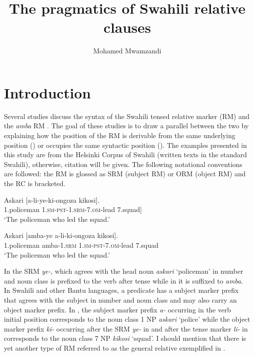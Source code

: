 \documentclass[output=paper,colorlinks,citecolor=brown]{langscibook}
\author{Mohamed Mwamzandi\affiliation{University of North Carolina at Chapel Hill}}
\title{The pragmatics of Swahili relative clauses}
\begin{document}
\maketitle 

\section{Introduction}\label{sec:mwamzandi:1}

Several studies discuss the syntax of the Swahili tensed relative marker (RM)  and the \textit{amba} RM . The goal of these studies is to draw a parallel between the two by explaining how the position of the RM is derivable from the same underlying position (\citealt{Vitale1981, Keach1985}) or occupies the same syntactic position (\citealt{DemuthHarford1999, Ngonyani2001, Ngonyani2006}). The examples presented in this study are from the Helsinki Corpus of Swahili (written texts in the standard Swahili), otherwise, citation will be given. The following notational conventions are followed: the RM is glossed as SRM (subject RM) or ORM (object RM) and the RC is bracketed.

\ea%
    \label{ex:mwamzandi:1}
    \gll    Askari [a-li-ye-ki-ongoza kikosi].\\
            1.policeman  \textsc{1.sm-pst-1.srm-7.om-}lead  7.squad]\\
    \glt    ‘The policeman who led the squad.’
\z

\ea%
    \label{ex:mwamzandi:2}
    \gll    Askari [amba-ye a-li-ki-ongoza kikosi].\\
            1.policeman  amba\textsc{-1.srm}  \textsc{1.sm-pst-7.om-}lead  7.squad\\
    \glt    ‘The policeman who led the squad.’
\z

In  the SRM \textit{ye-}, which agrees with the head noun \textit{askari} ‘policeman’ in number and noun class is prefixed to the verb after tense while in  it is suffixed to \textit{amba}. In Swahili and other Bantu languages, a predicate has a subject marker prefix that agrees with the subject in number and noun class and may also carry an object marker prefix. In , the subject marker prefix \textit{a-} occurring in the verb initial position corresponds to the noun class 1 NP \textit{askari} ‘police’ while the object marker prefix \textit{ki-} occurring after the SRM \textit{ye-} in  and after the tense marker \textit{li-} in  corresponds to the noun class 7 NP \textit{kikosi} ‘squad’. I should mention that there is yet another type of RM referred to as the general relative exemplified in .
\end{document}
